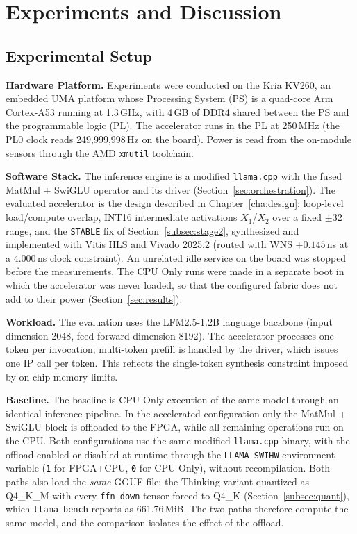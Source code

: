 \chapter{Experiments and Discussion}
\label{cha:experiments}

\section{Experimental Setup}
\label{sec:setup}

\textbf{Hardware Platform.} Experiments were conducted on the Kria KV260, an embedded
UMA platform whose Processing System (PS) is a quad-core Arm Cortex-A53 running at
1.3\,GHz, with 4\,GB of DDR4 shared between the PS and the programmable logic (PL). The
accelerator runs in the PL at 250\,MHz (the PL0 clock reads 249,999,998\,Hz on the
board). Power is read from the on-module sensors through the AMD \texttt{xmutil}
toolchain.

\textbf{Software Stack.} The inference engine is a modified \texttt{llama.cpp} with the
fused MatMul + SwiGLU operator and its driver (Section~\ref{sec:orchestration}). The
evaluated accelerator is the design described in Chapter~\ref{cha:design}: loop-level
load/compute overlap, INT16 intermediate activations $X_1$/$X_2$ over a fixed $\pm 32$
range, and the \texttt{STABLE} fix of Section~\ref{subsec:stage2}, synthesized and
implemented with Vitis HLS and Vivado 2025.2 (routed with WNS $+0.145$\,ns at a
4.000\,ns clock constraint). An unrelated idle service on the
board was stopped before the measurements. The CPU Only runs were made in a separate
boot in which the accelerator was never loaded, so that the configured fabric does not
add to their power (Section~\ref{sec:results}).

\textbf{Workload.} The evaluation uses the LFM2.5-1.2B language backbone (input
dimension 2048, feed-forward dimension 8192). The accelerator processes one token per
invocation; multi-token prefill is handled by the driver, which issues one IP call per
token. This reflects the single-token synthesis constraint imposed by on-chip memory
limits.

\textbf{Baseline.} The baseline is CPU Only execution of the same model through an
identical inference pipeline. In the accelerated configuration only the MatMul + SwiGLU
block is offloaded to the FPGA, while all remaining operations run on the CPU. Both
configurations use the same modified \texttt{llama.cpp} binary, with the offload
enabled or disabled at runtime through the \texttt{LLAMA\_SWIHW} environment variable
(\texttt{1} for FPGA+CPU, \texttt{0} for CPU Only), without recompilation. Both paths
also load the \emph{same} GGUF file: the Thinking variant quantized as Q4\_K\_M with
every \texttt{ffn\_down} tensor forced to Q4\_K (Section~\ref{subsec:quant}), which
\texttt{llama-bench} reports as 661.76\,MiB. The two paths therefore compute the same
model, and the comparison isolates the effect of the offload.


